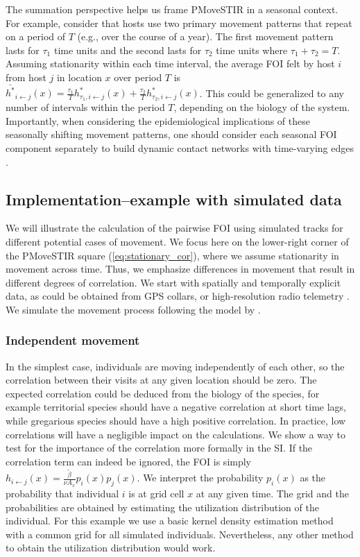 \documentclass[letterpaper]{article}
\begin{document}
The summation perspective helps us frame PMoveSTIR in a seasonal context.  For example, consider that hosts use two primary movement patterns that repeat on a period of $T$ (e.g., over the course of a year).  The first movement pattern lasts for $\tau_1$ time units and the second lasts for $\tau_2$ time units where $\tau_1 + \tau_2 = T$.  Assuming stationarity within each time interval, the average FOI felt by host $i$ from host $j$ in location $x$ over period $T$ is $\bar{h^*}_{i \leftarrow j}(x) = \frac{\tau_1}{T} h^*_{\tau_1, i \leftarrow j}(x) + \frac{\tau_2}{T} h^*_{\tau_2, i \leftarrow j}(x)$.  This could be generalized to any number of intervals within the period $T$, depending on the biology of the system.  Importantly, when considering the epidemiological implications of these seasonally shifting movement patterns, one should consider each seasonal FOI component separately to build dynamic contact networks with time-varying edges \citep{Wilber2022}.

\subsection*{Implementation--example with simulated data}

We will illustrate the calculation of the pairwise FOI using simulated tracks for different potential cases of movement. We focus here on the lower-right corner of the PMoveSTIR square (\ref{eq:stationary_cor}), where we assume stationarity in movement across time. Thus, we emphasize differences in movement that result in different degrees of correlation. We start with spatially and temporally explicit data, as could be obtained from GPS collars, or high-resolution radio telemetry \citep{Aspillaga2021}. We simulate the movement process following the model by \citet{Hooten2017}. 

\subsubsection{Independent movement}

In the simplest case, individuals are moving independently of each other, so the correlation between their visits at any given location should be zero. The expected correlation could be deduced from the biology of the species, for example territorial species should have a negative correlation at short time lags, while gregarious species should have a high positive correlation. In practice, low correlations will have a negligible impact on the calculations. We show a way to test for the importance of the correlation more formally in the SI. 
If the correlation term can indeed be ignored, the FOI is simply 
$h_{i\leftarrow j}(x)=\frac{\tilde\beta}{\nu A_x} p_i(x)p_j(x)$. 
We interpret the probability $p_i(x)$ as the probability that individual $i$ is at grid cell $x$ at any given time. The grid and the probabilities are obtained by estimating the utilization distribution of the individual. For this example we use a basic kernel density estimation method with a common grid for all simulated individuals. Nevertheless, any other method to obtain the utilization distribution would work. 
\end{document}
